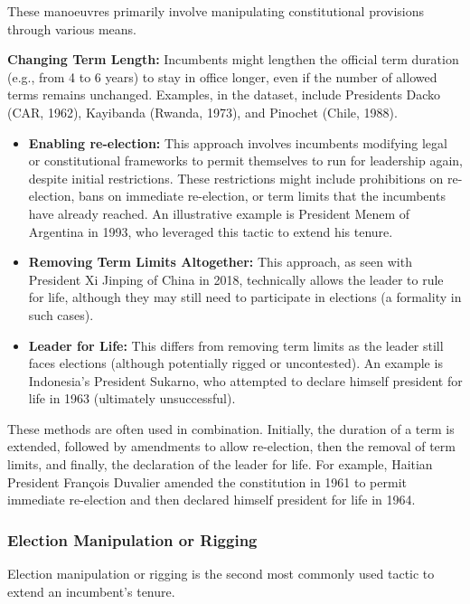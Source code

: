 \documentclass[
  12pt,
]{report}
\begin{document}
These manoeuvres primarily involve manipulating constitutional
provisions through various means.

\textbf{Changing Term Length:} Incumbents might lengthen the official
term duration (e.g., from 4 to 6 years) to stay in office longer, even
if the number of allowed terms remains unchanged. Examples, in the
dataset, include Presidents Dacko (CAR, 1962), Kayibanda (Rwanda, 1973),
and Pinochet (Chile, 1988).

\begin{itemize}
\item
  \textbf{Enabling re-election:} This approach involves incumbents
  modifying legal or constitutional frameworks to permit themselves to
  run for leadership again, despite initial restrictions. These
  restrictions might include prohibitions on re-election, bans on
  immediate re-election, or term limits that the incumbents have already
  reached. An illustrative example is President Menem of Argentina in
  1993, who leveraged this tactic to extend his tenure.
\item
  \textbf{Removing Term Limits Altogether:} This approach, as seen with
  President Xi Jinping of China in 2018, technically allows the leader
  to rule for life, although they may still need to participate in
  elections (a formality in such cases).
\item
  \textbf{Leader for Life:} This differs from removing term limits as
  the leader still faces elections (although potentially rigged or
  uncontested). An example is Indonesia's President Sukarno, who
  attempted to declare himself president for life in 1963 (ultimately
  unsuccessful).
\end{itemize}

These methods are often used in combination. Initially, the duration of
a term is extended, followed by amendments to allow re-election, then
the removal of term limits, and finally, the declaration of the leader
for life. For example, Haitian President François Duvalier amended the
constitution in 1961 to permit immediate re-election and then declared
himself president for life in 1964.

\subsubsection*{Election Manipulation or
Rigging}\label{election-manipulation-or-rigging}

Election manipulation or rigging is the second most commonly used tactic
to extend an incumbent's tenure.
\end{document}
